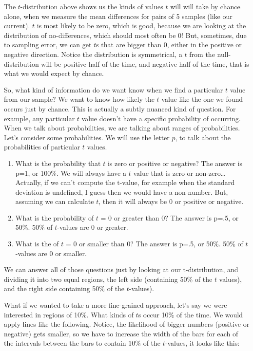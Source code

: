 \documentclass[
]{book}
\begin{document}
The \(t\)-distribution above shows us the kinds of values \(t\) will will take by chance alone, when we measure the mean differences for pairs of 5 samples (like our current). \(t\) is most likely to be zero, which is good, because we are looking at the distribution of no-differences, which should most often be 0! But, sometimes, due to sampling error, we can get \(t\)s that are bigger than 0, either in the positive or negative direction. Notice the distribution is symmetrical, a \(t\) from the null-distribution will be positive half of the time, and negative half of the time, that is what we would expect by chance.

So, what kind of information do we want know when we find a particular \(t\) value from our sample? We want to know how likely the \(t\) value like the one we found occurs just by chance. This is actually a subtly nuanced kind of question. For example, any particular \(t\) value doesn't have a specific probability of occurring. When we talk about probabilities, we are talking about ranges of probabilities. Let's consider some probabilities. We will use the letter \(p\), to talk about the probabilities of particular \(t\) values.

\begin{enumerate}
\def\labelenumi{\arabic{enumi}.}
\item
  What is the probability that \(t\) is zero or positive or negative? The answer is p=1, or 100\%. We will always have a \(t\) value that is zero or non-zero\ldots Actually, if we can't compute the t-value, for example when the standard deviation is undefined, I guess then we would have a non-number. But, assuming we can calculate \(t\), then it will always be 0 or positive or negative.
\item
  What is the probability of \(t\) = 0 or greater than 0? The answer is p=.5, or 50\%. 50\% of \(t\)-values are 0 or greater.
\item
  What is the of \(t\) = 0 or smaller than 0? The answer is p=.5, or 50\%. 50\% of \(t\)-values are 0 or smaller.
\end{enumerate}

We can answer all of those questions just by looking at our t-distribution, and dividing it into two equal regions, the left side (containing 50\% of the \(t\) values), and the right side containing 50\% of the \(t\)-values).

What if we wanted to take a more fine-grained approach, let's say we were interested in regions of 10\%. What kinds of \(t\)s occur 10\% of the time. We would apply lines like the following. Notice, the likelihood of bigger numbers (positive or negative) gets smaller, so we have to increase the width of the bars for each of the intervals between the bars to contain 10\% of the \(t\)-values, it looks like this:
\end{document}
